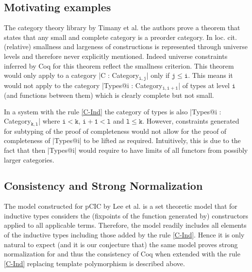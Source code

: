 \documentclass{easychair}
\begin{document}
\subsection*{Motivating examples}
The category theory library by Timany et
al. \cite{DBLP:conf/rta/Timany016} the authors prove a theorem that
states that any small and complete category is a preorder category.
In loc. cit. (relative) smallness and largeness of constructions is
represented through universe levels and therefore never explicitly
mentioned.  Indeed universe constraints inferred by Coq for this
theorem reflect the smallness criterion. This theorem would only apply
to a category \Coqe|C : Category$_{\mathtt{i, j}}$| only if
$\mathtt{j \le i}$. This means it would not apply to the category
\Coqe|Types@{i} : Category$_{\mathtt{i, i + 1}}$| of types at level
$\mathtt{i}$ (and functions between them) which is clearly complete 
but not small.

In a system with the rule \ref{C-Ind} the category of types is also
\Coqe|Types@{i} : Category$_{\mathtt{k, l}}$| where $\mathtt{i < k}$,
$\mathtt{i + 1 < l}$ and $\mathtt{l \le k}$. However, constraints
generated for subtyping of the proof of completeness would not allow
for the proof of completeness of \Coqe|Types@{i}| to be lifted as
required. Intuitively, this is due to the fact that then
\Coqe|Types@{i}| would require to have limits of all functors from
possibly larger categories.


\subsection*{Consistency and Strong Normalization}
The model constructed for pCIC by Lee et
al. \cite{DBLP:journals/corr/abs-1111-0123} is a set theoretic model
that for inductive types considers the (fixpoints of the function
generated by) constructors applied to all applicable terms. Therefore,
the model readily includes all elements of the inductive types
including those added by the rule \ref{C-Ind}. Hence it is only
natural to expect (and it is our conjecture that) the same model
proves strong normalization for and thus the consistency of Coq when
extended with the rule \ref{C-Ind} replacing template polymorphism is
described above.


\setlength{\bibsep}{1pt} %
\renewcommand{\bibfont}{\small} %


\end{document}
